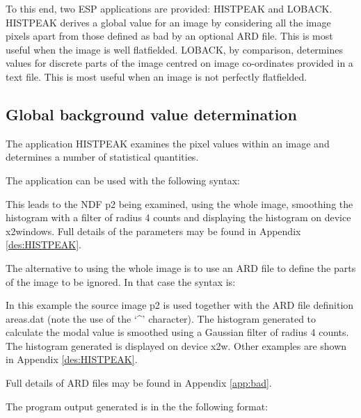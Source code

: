 \documentclass[twoside,11pt]{starlink}
\begin{document}
To this end, two ESP applications are provided: HISTPEAK and LOBACK.
HISTPEAK derives a global value for an image by considering all the
image pixels apart from those defined as bad by an optional ARD
file. This is most useful when the image is well flatfielded. LOBACK,
by comparison, determines values for discrete parts of the image
centred on image co-ordinates provided in a text file. This is most
useful when an image is not perfectly flatfielded.

\subsection{Global background value determination}

The application HISTPEAK examines the pixel values within an image
and determines a number of statistical quantities.

The application can be used with the following syntax:

\begin{terminalv}
\end{terminalv}

This leads to the NDF p2 being examined, using the whole image, smoothing
the histogram with a filter of radius 4 counts and displaying the histogram on
device x2windows. Full details of the parameters may be found in Appendix
\ref{des:HISTPEAK}.

The alternative to using the whole image is to use an ARD file to define the
parts of the image to be ignored. In that case the syntax is:

\begin{terminalv}
\end{terminalv}

In this example the source image p2 is used together with the
ARD file definition areas.dat (note the use of the `\^{ }' character).
The histogram generated to
calculate the modal value is smoothed using a Gaussian filter
of radius 4 counts. The histogram generated is displayed on
device x2w. Other examples are shown in Appendix \ref{des:HISTPEAK}.

Full details of ARD files may be found in Appendix \ref{app:bad}.

The program output generated is in the the following format:
\end{document}
